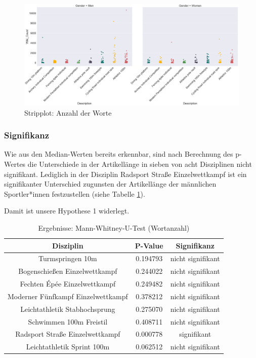 \documentclass[11pt]{article}
\begin{document}
\begin{figure}
\includegraphics[width=1\textwidth]{figures/wordcount_stripplot.png}
\caption[Stripplot: Anzahl der Worte]{Stripplot: Anzahl der Worte}
\label{fig:wordcountStripPlot}
\end{figure}

\subsubsection{Signifikanz}
Wie aus den Median-Werten bereits erkennbar, sind nach Berechnung des p-Wertes die Unterschiede in der Artikellänge in sieben von acht Disziplinen nicht signifikant. Lediglich in der Disziplin Radsport Straße Einzelwettkampf ist ein signifikanter Unterschied zugunsten der Artikellänge der männlichen Sportler*innen festzustellen (siehe Tabelle \ref{tab:utest_wordcount}).

Damit ist unsere Hypothese 1 widerlegt.

\begin{table}
\caption{\label{tab:utest_wordcount}Ergebnisse: Mann-Whitney-U-Test (Wortanzahl)}
\centering
\begin{tabular}{ c|c|c }
  Disziplin & P-Value & Signifikanz \\
  \hline
  Turmspringen 10m & 0.194793 & nicht signifikant \\
  Bogenschießen Einzelwettkampf & 0.244022 & nicht signifikant \\
  Fechten Épée Einzelwettkampf & 0.249482 & nicht signifikant \\
  Moderner Fünfkampf Einzelwettkampf & 0.378212 & nicht signifikant \\
  Leichtathletik Stabhochsprung & 0.275070 & nicht signifikant \\
  Schwimmen 100m Freistil & 0.408711 & nicht signifikant \\
  Radsport Straße Einzelwettkampf & 0.000778 & signifikant \\
  Leichtathletik Sprint 100m & 0.062512 & nicht signifikant \\
\end{tabular}
\end{table}
\end{document}
